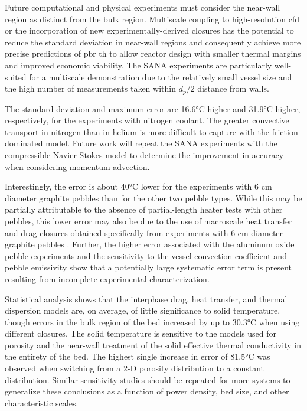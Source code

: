 Future computational and physical experiments must consider the near-wall region as distinct from the bulk region. Multiscale coupling to high-resolution \gls{cfd} or the incorporation of new experimentally-derived closures has the potential to reduce the standard deviation in near-wall regions and consequently achieve more precise predictions of \gls{pbr} \gls{th} to allow reactor design with smaller thermal margins and improved economic viability. The SANA experiments are particularly well-suited for a multiscale demonstration due to the relatively small vessel size and the high number of measurements taken within \(d_p/2\) distance from walls.

The standard deviation and maximum error are 16.6\si{\celsius} higher and 31.9\si{\celsius} higher, respectively, for the experiments with nitrogen coolant. The greater convective transport in nitrogen than in helium is more difficult to capture with the friction-dominated model. Future work will repeat the SANA experiments with the compressible Navier-Stokes model to determine the improvement in accuracy when considering momentum advection.

Interestingly, the error is about 40\si{\celsius} lower for the experiments with 6 \si{\centi\meter} diameter graphite pebbles than for the other two pebble types. While this may be partially attributable to the absence of partial-length heater tests with other pebbles, this lower error may also be due to the use of macroscale heat transfer and drag closures obtained specifically from experiments with 6 \si{\centi\meter} diameter graphite pebbles \cite{KTA,KTAhtc}. Further, the higher error associated with the aluminum oxide pebble experiments and the sensitivity to the vessel convection coefficient and pebble emissivity show that a potentially large systematic error term is present resulting from incomplete experimental characterization.

Statistical analysis shows that the interphase drag, heat transfer, and thermal dispersion models are, on average, of little significance to solid temperature, though errors in the bulk region of the bed increased by up to 30.3\si{\celsius} when using different closures. The solid temperature is sensitive to the models used for porosity and the near-wall treatment of the solid effective thermal conductivity in the entirety of the bed. The highest single increase in error of 81.5\si{\celsius} was observed when switching from a 2-D porosity distribution to a constant distribution. Similar sensitivity studies should be repeated for more systems to generalize these conclusions as a function of power density, bed size, and other characteristic scales.
